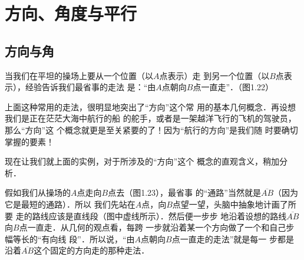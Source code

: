 \section{方向、角度与平行}
\subsection{方向与角}
当我们在平坦的操场上要从一个位置（以$A$点表示）走
到另一个位置（以$B$点表示），经验告诉我们最省事的走法
是：“由$A$点朝向$B$点一直走”．（图1.22）

\begin{figure}[htp]
	\centering
{}
	\caption{}
\end{figure}

上面这种常用的走法，很明显地突出了“方向”这个常
用的基本几何概念．再设想我们是正在茫茫大海中航行的船
的舵手，或者是一架越洋飞行的飞机的驾驶员，那么“方向”这
个概念就更是至关紧要的了！因为“航行的方向”是我们随
时要确切掌握的要素！

现在让我们就上面的实例，对于所涉及的“方向”这个
概念的直观含义，稍加分析．

假如我们从操场的$A$点走向$B$点去（图1.23），最省事
的“通路”当然就是$\overline{AB}$（因为它是最短的通路）．所以
我们先站在$A$点，向$B$点望一望，头脑中抽象地计画了所要
走的路线应该是直线段（图中虚线所示）．然后便一步步
地沿着设想的路线$\overline{AB}$向$B$点一直走．从几何的观点看，每跨
一步就沿着某一个方向做了一个和自己步幅等长的“有向线
段”．所以说，“由$A$点朝向$B$点一直走的走法”就是每一
步都是沿着$\overline{AB}$这个固定的方向走的那种走法．


\begin{figure}[htp]
	\centering
{}
	\caption{}
\end{figure}

